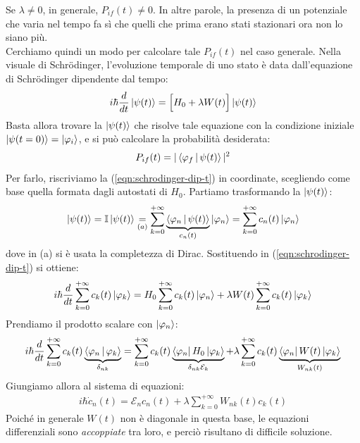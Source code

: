 \documentclass[../../InformazioneQuantistica.tex]{subfiles}
\begin{document}
Se $\lambda \neq 0$, in generale, $P_{if}(t) \neq 0$. In altre parole, la presenza di un potenziale che varia nel tempo fa sì che quelli che prima erano stati stazionari ora non lo siano più.\\
Cerchiamo quindi un modo per calcolare tale $P_{if}(t)$ nel caso generale. Nella visuale di Schr\"odinger, l'evoluzione temporale di uno stato è data dall'equazione di Schr\"odinger dipendente dal tempo:
\begin{align}
    i\hbar \frac{d}{dt} \Ket{\psi(t)} = \Big[H_0 + \lambda W(t) \Big] \Ket{\psi(t)}
    \label{eqn:schrodinger-dip-t}
\end{align}
Basta allora trovare la $\Ket{\psi(t)}$ che risolve tale equazione con la condizione iniziale $\Ket{\psi(t=0)} = \Ket{\varphi_i}$, e si può calcolare la probabilità desiderata:
\begin{align*}
    P_{if}(t) = |\Braket{\varphi_f|\psi(t)}|^2
\end{align*}
Per farlo, riscriviamo la (\ref{eqn:schrodinger-dip-t}) in coordinate, scegliendo come base quella formata dagli autostati di $H_0$. Partiamo trasformando la $\Ket{\psi(t)}$:
\begin{align}
    \Ket{\psi(t)} = \mathbb{I}\Ket{\psi(t)} \underset{(a)}{=} \sum_{k=0}^{+\infty}\underbrace{\Braket{\varphi_n|\psi(t)}}_{c_n(t)}\Ket{\varphi_n} = \sum_{k=0}^{+\infty} c_n(t) \Ket{\varphi_n}
    \label{eqn:psi-t-baseH0}
\end{align}
dove in (a) si è usata la completezza di Dirac. Sostituendo in (\ref{eqn:schrodinger-dip-t}) si ottiene:
\begin{align*}
    i\hbar \frac{d}{dt} \sum_{k=0}^{+\infty} c_k(t) \Ket{\varphi_k} = H_0 \sum_{k=0}^{+\infty} c_k(t)\Ket{\varphi_n} + \lambda W(t) \sum_{k=0}^{+\infty} c_k(t) \Ket{\varphi_k}
\end{align*}
Prendiamo il prodotto scalare con $\Ket{\varphi_n}$:
\begin{align*}
    i\hbar \frac{d}{dt} \sum_{k=0}^{+\infty} c_k(t) \underbrace{\Braket{\varphi_n|\varphi_k}}_{\delta_{nk}} = \sum_{k=0}^{+\infty} c_k(t) \underbrace{\Bra{\varphi_n}H_0 \Ket{\varphi_k}}_{\delta_{nk}\mathcal{E}_k} + \lambda \sum_{k=0}^{+\infty} c_k(t) \underbrace{\Bra{\varphi_n}W(t)\Ket{\varphi_k}}_{W_{nk}(t)}
\end{align*}
Giungiamo allora al sistema di equazioni:
\begin{align}
    i\hbar \dot{c}_n(t) = \mathcal{E}_n c_n(t) + \lambda \sum_{k=0}^{+\infty} W_{nk}(t) c_k(t)
    \label{eqn:equazioni-dip-t}
\end{align}
Poiché in generale $W(t)$ non è diagonale in questa base, le equazioni differenziali sono \textit{accoppiate} tra loro, e perciò risultano di difficile soluzione.\\
\end{document}
